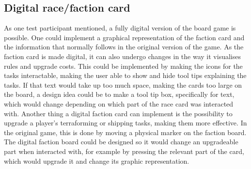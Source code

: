 \subsection{Digital race/faction card}\label{sec:DigiRaceFact}
As one test participant mentioned, a fully digital version of the board game is possible. One could implement a graphical representation of the faction card and the information that normally follows in the original version of the game. As the faction card is made digital, it can also undergo changes in the way it visualises rules and upgrade costs. This could be implemented by making the icons for the tasks interactable, making the user able to show and hide tool tips explaining the tasks. If that text would take up too much space, making the cards too large on the board, a design idea could be to make a tool tip box, specifically for text, which would change depending on which part of the race card was interacted with. Another thing a digital faction card can implement is the possibility to upgrade a player's terraforming or shipping tasks, making them more effective. In the original game, this is done by moving a physical marker on the faction board. The digital faction board could be designed so it would change an upgradeable part when interacted with, for example by pressing the relevant part of the card, which would upgrade it and change its graphic representation.


